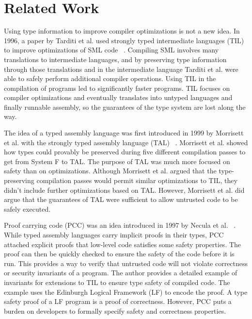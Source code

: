 \chapter{Related Work}
\label{chp:relwork}

Using type information to improve compiler optimizations is not a new idea.
In 1996, a paper by Tarditi et al. used strongly typed intermediate languages (TIL) to improve optimizations of SML code ~\cite{TIL}.
Compiling SML involves many translations to intermediate languages, and by preserving type information through those translations and in the intermediate language Tarditi et al. were able to safely perform additional compiler operations.
Using TIL in the compilation of programs led to significantly faster programs.
TIL focuses on compiler optimizations and eventually translates into untyped languages and finally runnable assembly, so the guarantees of the type system are lost along the way.

The idea of a typed assembly language was first introduced in 1999 by Morrisett et al. with the strongly typed assembly language (TAL) ~\cite{FToTAL}.
Morrisett et al. showed how types could provably be preserved during five different compilation passes to get from System F to TAL.
The purpose of TAL was much more focused on safety than on optimizations.
Although Morrisett et al. argued that the type-preserving compilation passes would permit similar optimizations to TIL, they didn't include further optimizations based on TAL.
However, Morrisett et al. did argue that the guarantees of TAL were sufficient to allow untrusted code to be safely executed.


Proof carrying code (PCC) was an idea introduced in 1997 by Necula et al. ~\cite{PCC}.
While typed assembly languages carry implicit proofs in their types, PCC attached explicit proofs that low-level code satisfies some safety properties.
The proof can then be quickly checked to ensure the safety of the code before it is run.
This provides a way to verify that untrusted code will not violate correctness or security invariants of a program.
The author provides a detailed example of invariants for extensions to TIL to ensure type safety of compiled code.
The example uses the Edinburgh Logical Framework (LF) to encode the proof.
A type safety proof of a LF program is a proof of correctness.
However, PCC puts a burden on developers to formally specify safety and correctness properties.


